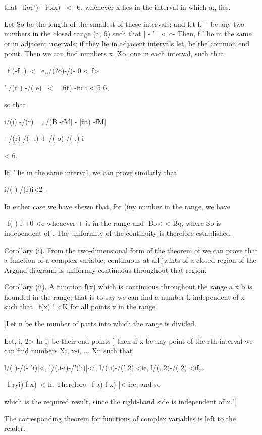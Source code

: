 that \ fioc') - f xx) \ < -€, whenever x lies in the interval in which
a;, lies.

Let So be the length of the smallest of these intervals; and let f,
|' be any two numbers in the closed range (a, 6) such that | - ' | <
o- Then, f ' lie in the same or in adjacent intervals; if they lie
in adjacent intervals let, be the common end point. Then we can find
numbers x, Xo, one in each interval, such that

\ f )-f .)\ < \ e,,/(?o)-/(- 0 < f>

' /(r ) -/( e) \ < \ \, fit) -fu i < 5 6,

so that

i/(i) -/(r) =, /(B -fM] - [fit) -fM]

- /(r)-/( -.) + /( o)-/( .) i

< 6.

If, ' lie in the same interval, we can prove similarly that

i/( )-/(r)i<2 -

In either case we have shewn that, for (iny number in the range, we
have

\ f( )-f +0 <e whenever + is in the range and -Bo< < Bq, where So is
independent of . The uniformity of the continuity is therefore
established.

Corollary (i). From the two-dimensional form of the theorem of
we can prove that a function of a complex variable, continuous at all
jwints of a closed region of the Argand diagram, is uniformly
continuous throughout that region.

Corollary (ii). A function f(x) which is continuous throughout the
range a x b is hounded in the range; that is to say we can find a
number k independent of x such that \ f(x) ! <K for all points x in
the range.

[Let n be the number of parts into which the range is divided.

Let, i, 2>  In-ij be their end points ] then if x be any point of
the rth interval we can find numbers Xi, x-i, ... Xn such that

l/( )-/(- 'i)|<, l/(.i-i)-/'(li)|<i, l/( i)-/(' 2)|<ie, l/(. 2)-/(
2)|<if,...

 \ f ryi)-f x)\ < h. Therefore \ f a)-f x) |< ire, and so

which is the required result, since the right-hand side is independent
of x."]

The corresponding theorem for functions of complex variables is left
to the reader.

